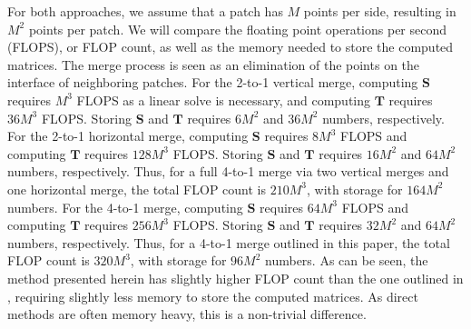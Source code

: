 For both approaches, we assume that a patch has $M$ points per side, resulting in $M^2$ points per patch. We will compare the floating point operations per second (FLOPS), or FLOP count, as well as the memory needed to store the computed matrices. The merge process is seen as an elimination of the points on the interface of neighboring patches. For the 2-to-1 vertical merge, computing $\textbf{S}$ requires $M^3$ FLOPS as a linear solve is necessary, and computing $\textbf{T}$ requires $36M^3$ FLOPS. Storing $\textbf{S}$ and $\textbf{T}$ requires $6M^2$ and $36M^2$ numbers, respectively. For the 2-to-1 horizontal merge, computing $\textbf{S}$ requires $8M^3$ FLOPS and computing $\textbf{T}$ requires $128M^3$ FLOPS. Storing $\textbf{S}$ and $\textbf{T}$ requires $16M^2$ and $64M^2$ numbers, respectively. Thus, for a full 4-to-1 merge via two vertical merges and one horizontal merge, the total FLOP count is $210M^3$, with storage for $164M^2$ numbers. For the 4-to-1 merge, computing $\textbf{S}$ requires $64M^3$ FLOPS and computing $\textbf{T}$ requires $256M^3$ FLOPS. Storing $\textbf{S}$ and $\textbf{T}$ requires $32M^2$ and $64M^2$ numbers, respectively. Thus, for a 4-to-1 merge outlined in this paper, the total FLOP count is $320M^3$, with storage for $96M^2$ numbers. As can be seen, the method presented herein has slightly higher FLOP count than the one outlined in \citep{gillman2014direct}, requiring slightly less memory to store the computed matrices. As direct methods are often memory heavy, this is a non-trivial difference.